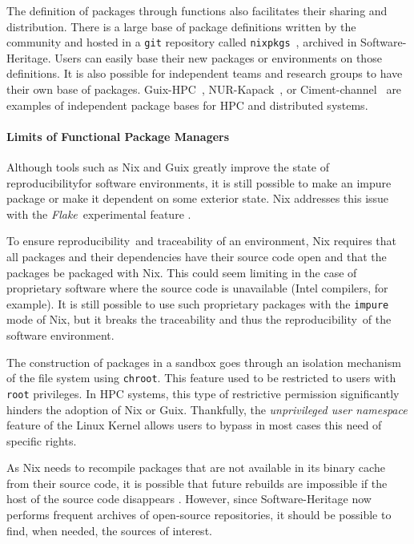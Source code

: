 \documentclass[sigconf,natbib=false]{acmart}
\newcommand{\repro}{reproducibility}
\begin{document}
The definition of packages through functions also facilitates their sharing and distribution.
There is a large base of package definitions written by the community and hosted in a \texttt{git} repository called \texttt{nixpkgs}\ \cite{nixpkgs, repology}, archived in Software-Heritage.
Users can easily base their new packages or environments on those definitions.
It is also possible for independent teams and research groups to have their own base of packages.
Guix-HPC\ \cite{guix-hpc}, NUR-Kapack\ \cite{kapack}, or Ciment-channel\ \cite{ciment_channel} are examples of independent package bases for HPC and distributed systems.

\paragraph{Limits of Functional Package Managers}

Although tools such as Nix and Guix greatly improve the state of \repro for software environments, it is still possible to make an impure package or make it dependent on some exterior state.
Nix addresses this issue with the \emph{Flake}\ experimental feature \cite{flakes}.

To ensure \repro\ and traceability of an environment, Nix requires that all packages and their dependencies have their source code open and that the packages be packaged with Nix.
This could seem limiting in the case of proprietary software where the source code is unavailable (Intel compilers, for example).
It is still possible to use such proprietary packages with the \texttt{impure} mode of Nix, but it breaks the traceability and thus the \repro\ of the software environment. 

The construction of packages in a sandbox goes through an isolation mechanism of the file system using \texttt{chroot}.
This feature used to be restricted to users with \texttt{root} privileges.
In HPC systems, this type of restrictive permission significantly hinders the adoption of Nix or Guix.
Thankfully, the \emph{unprivileged user namespace} feature of the Linux Kernel allows users to bypass in most cases this need of specific rights.

As Nix needs to recompile packages that are not available in its binary cache from their source code, it is possible that future rebuilds are impossible if the host of the source code disappears \cite{blinry}.
However, since Software-Heritage now performs frequent archives of open-source repositories, it should be possible to find, when needed, the sources of interest.
\end{document}

